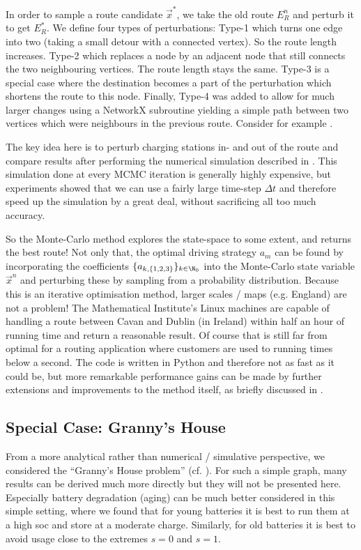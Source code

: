 \documentclass{prettytex/ox/mmsc-special-topic}
\begin{document}
  In order to sample a route candidate $\vec{x}^*$, we take the old route $E_R^n$ and perturb it to get $E_R^*$.
  We define four types of perturbations: Type-1 which turns one edge into two (taking a small detour with a connected vertex). So the route length increases.
  Type-2 which replaces a node by an adjacent node that still connects the two neighbouring vertices. The route length stays the same.
  Type-3 is a special case where the destination becomes a part of the perturbation which shortens the route to this node.
  Finally, Type-4 was added to allow for much larger changes using a NetworkX subroutine yielding a simple path between two vertices which were neighbours in the previous route. Consider for example .

  The key idea here is to perturb charging stations in- and out of the route and compare results after performing the numerical simulation described in .
  This simulation done at every MCMC iteration is generally highly expensive, but experiments showed that we can use a fairly large time-step $\Delta t$ and therefore speed up the simulation by a great deal, without sacrificing all too much accuracy.

  So the Monte-Carlo method explores the state-space to some extent, and returns the best route!
  Not only that, the optimal driving strategy $a_m$ can be found by incorporating the coefficients $\{a_{k,\{1,2,3\}}\}_{k\in\N_0}$ into the Monte-Carlo state variable $\vec{x}^{n}$ and perturbing these by sampling from a probability distribution.
  Because this is an iterative optimisation method, larger scales / maps (e.g. England) are not a problem! The Mathematical Institute's Linux machines are capable of handling a route between Cavan and Dublin (in Ireland) within half an hour of running time and return a reasonable result.
  Of course that is still far from optimal for a routing application where customers are used to running times below a second.
  The code is written in Python and therefore not as fast as it could be, but more remarkable performance gains can be made by further extensions and improvements to the method itself, as briefly discussed in .

  \subsection{Special Case: Granny's House}
  From a more analytical rather than numerical / simulative perspective, we considered the ``Granny's House problem'' (cf. ).
  For such a simple graph, many results can be derived much more directly but they will not be presented here.
  Especially battery degradation (aging) can be much better considered in this simple setting, where we found that for young batteries it is best to run them at a high \gls{soc} and store at a moderate charge. Similarly, for old batteries it is best to avoid usage close to the extremes $s = 0$ and $s = 1$.
\end{document}
